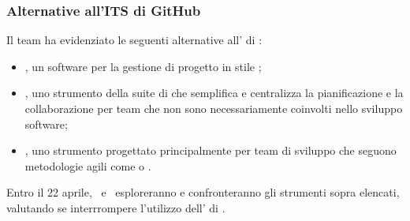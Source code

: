 \subsubsection{Alternative all'ITS di GitHub}
\par Il team ha evidenziato le seguenti alternative all' di :
\begin{itemize}
  \item {}, un software per la gestione di progetto in stile ;
  \item {}, uno strumento della suite di  che semplifica e centralizza la pianificazione e la collaborazione per team che non sono necessariamente coinvolti nello sviluppo software;
  \item {}, uno strumento progettato principalmente per team di sviluppo che seguono metodologie agili come  o .
\end{itemize}

\vspace{0.5\baselineskip}
\par Entro il 22 aprile, \riccardo\ e \mattia\ esploreranno e confronteranno gli strumenti sopra elencati, valutando se interrrompere l'utilizzo dell' di .